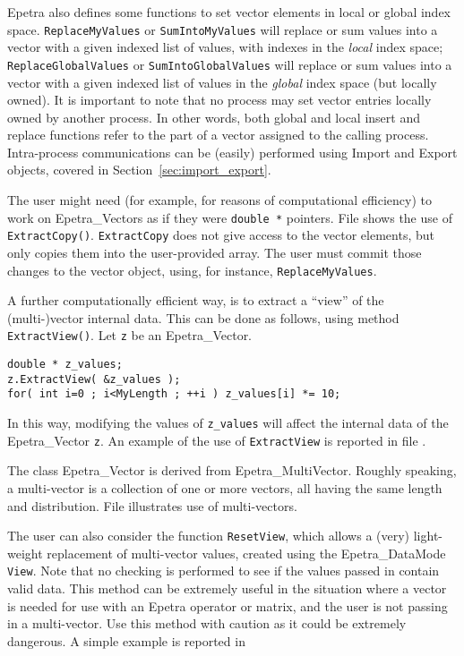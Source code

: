 Epetra also defines some functions to set vector elements in local or
global index space.  \verb!ReplaceMyValues! or \verb!SumIntoMyValues!
will replace or sum values into a vector with a given indexed list of
values, with indexes in the {\em local} index space;
\verb!ReplaceGlobalValues! or \verb!SumIntoGlobalValues! will replace or
sum values into a vector with a given indexed list of values in the {\em
  global} index space (but locally owned). It is important to note that
no process may set vector entries locally owned by another process. In
other words, both global and local insert and replace functions refer to
the part of a vector assigned to the calling process. Intra-process
communications can be (easily) performed using Import and Export
objects, covered in Section~\ref{sec:import_export}.

The user might need (for example, for reasons of computational
efficiency) to work on Epetra\_Vectors as if they were \verb!double *!
pointers.  File \newline {} \newline shows the use
of \verb!ExtractCopy()!.  \verb!ExtractCopy! does not give access to the
vector elements, but only copies them into the user-provided array.  The
user must commit those changes to the vector object, using, for
instance, \verb!ReplaceMyValues!.

A further computationally efficient way, is to extract a ``view'' of the
(multi-)vector internal data.  This can be done as follows, using method
\verb!ExtractView()!. Let \verb!z! be an Epetra\_Vector. 
\begin{verbatim}
double * z_values;
z.ExtractView( &z_values );
for( int i=0 ; i<MyLength ; ++i ) z_values[i] *= 10;
\end{verbatim}
In this way, modifying the values of \verb!z_values! will affect the
internal data of the Epetra\_Vector \verb!z!.  An example of the use of
\verb!ExtractView! is reported in file \newline {}.

\begin{remark}
  The class Epetra\_Vector is derived from Epetra\_MultiVector. Roughly
  speaking, a multi-vector is a collection of one or more vectors, all
  having the same length and distribution.  File 
  illustrates use of multi-vectors.
\end{remark}

The user can also consider the function \verb!ResetView!, which allows a
(very) light-weight replacement of multi-vector values, created using
the Epetra\_DataMode \verb!View!. Note that no checking is performed to
see if the values passed in contain valid data. This method can be
extremely useful in the situation where a vector is needed for use with
an Epetra operator or matrix, and the user is not passing in a
multi-vector. Use this method with caution as it could be extremely
dangerous.  A simple example is reported in \newline
{}

